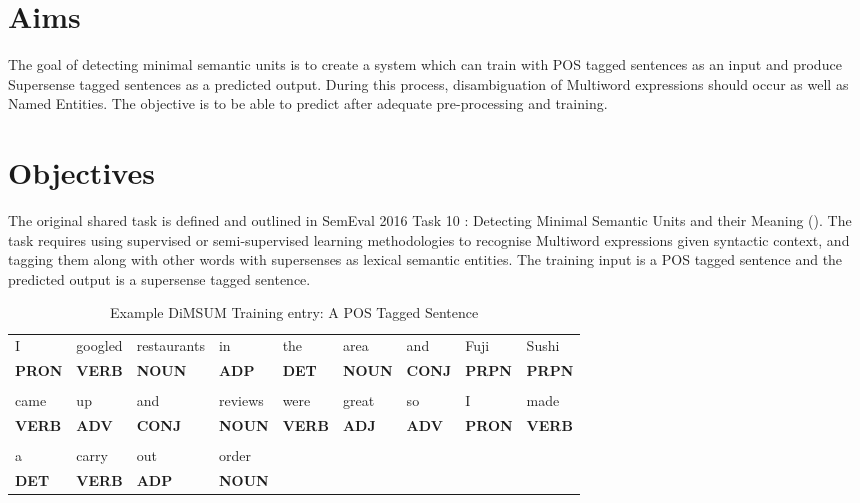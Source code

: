 \section{Aims}

The goal of detecting minimal semantic units is to create a system which can train with POS tagged sentences as an input and produce Supersense tagged sentences as a predicted output. During this process, disambiguation of Multiword expressions should occur as well as Named Entities.
The objective is to be able to predict after adequate pre-processing and training.

\section{Objectives}

The original shared task is defined and outlined in SemEval 2016 Task 10 \cite{dimsum16web}: Detecting Minimal Semantic Units and their Meaning (\dimsum). The task requires using supervised or semi-supervised learning methodologies to recognise Multiword expressions given syntactic context, and tagging them along with other words with supersenses as lexical semantic entities. The training input is a POS tagged sentence and the predicted output is a supersense tagged sentence.

\begin{table}[!htbp]
\small
\centering
  \begin{framed}
  \begin{tabular}{lllllllll} 
    I    & googled & restaurants & in  & the & area & and  & Fuji  & Sushi\\
    {\bf PRON} & {\bf VERB}    & {\bf NOUN}        & {\bf ADP} & {\bf DET} & {\bf NOUN} & {\bf CONJ} & {\bf PRPN} & {\bf PRPN}\\
    & \\
    came & up  & and  & reviews & were & great & so  & I    & made\\
    {\bf VERB} & {\bf ADV} & {\bf CONJ} & {\bf NOUN}    & {\bf VERB} & {\bf ADJ}   & {\bf ADV} & {\bf PRON} & {\bf VERB}\\
    & \\
    a & carry & out & order & & & & & \\
    {\bf DET} & {\bf VERB} & {\bf ADP} & {\bf NOUN} & & & & &
  \end{tabular}
  \end{framed}
  \caption{Example DiMSUM Training entry: A POS Tagged Sentence}
  \label{tab:dimsumtraininput}
\end{table}


